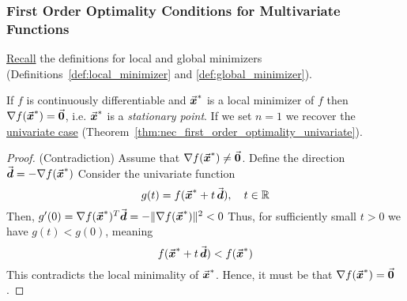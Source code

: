 \subsubsection{First Order Optimality Conditions for Multivariate Functions}
\hyperref[subsec:global_local_optimization]{Recall} the definitions for local and global minimizers (Definitions~\ref{def:local_minimizer} and \ref{def:global_minimizer}).

\begin{theorem}\label{thm:nec_first_order_optimality_multivariate}
If \(f\) is continuously differentiable and \(\vec{\boldsymbol{x}}^{*}\) is a local minimizer of \(f\) then 
\(\nabla f(\vec{\boldsymbol{x}}^{*})=\vec{\boldsymbol{0}}\), i.e. \(\vec{\boldsymbol{x}}^{*}\) is a \emph{stationary point}. If we set \(n=1\) we recover the \hyperref[thm:nec_first_order_optimality_univariate]{univariate case} (Theorem~\ref{thm:nec_first_order_optimality_univariate}).
\end{theorem}
\begin{proof}
(Contradiction)
Assume that \(\nabla f(\vec{\boldsymbol{x}}^{*})\neq \vec{\boldsymbol{0}}\). Define the direction
\(
\vec{\boldsymbol{d}}=-\nabla f(\vec{\boldsymbol{x}}^{*})
\)
Consider the univariate function
\[
g(t)=f(\vec{\boldsymbol{x}}^{*}+t\,\vec{\boldsymbol{d}}),\quad t\in\mathbb{R}
\]
Then,
\(
g'(0)=\nabla f(\vec{\boldsymbol{x}}^{*})^{T}\vec{\boldsymbol{d}}=-\|\nabla f(\vec{\boldsymbol{x}}^{*})\|^{2}<0
\)
Thus, for sufficiently small \(t>0\) we have \(g(t)<g(0)\), meaning
\[
f(\vec{\boldsymbol{x}}^{*}+t\,\vec{\boldsymbol{d}})<f(\vec{\boldsymbol{x}}^{*})
\]
This contradicts the local minimality of \(\vec{\boldsymbol{x}}^{*}\). Hence, it must be that \(\nabla f(\vec{\boldsymbol{x}}^{*})=\vec{\boldsymbol{0}}\).
\end{proof}

